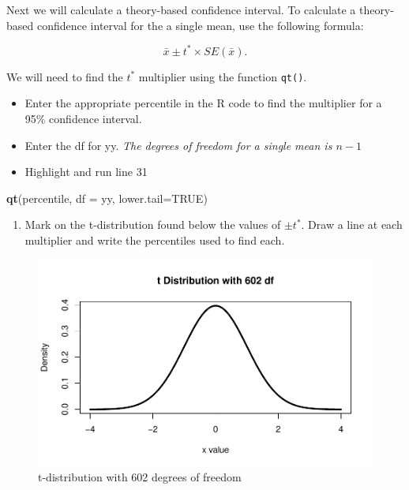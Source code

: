 \documentclass[
]{report}
\newenvironment{Shaded}{\begin{snugshade}}{\end{snugshade}}
\newcommand{\AttributeTok}[1]{\textcolor[rgb]{0.13,0.29,0.53}{#1}}
\newcommand{\ConstantTok}[1]{\textcolor[rgb]{0.56,0.35,0.01}{#1}}
\newcommand{\FunctionTok}[1]{\textcolor[rgb]{0.13,0.29,0.53}{\textbf{#1}}}
\newcommand{\NormalTok}[1]{#1}
\providecommand{\tightlist}{%
  \setlength{\itemsep}{0pt}\setlength{\parskip}{0pt}}
\begin{document}
Next we will calculate a theory-based confidence interval. To calculate a theory-based confidence interval for the a single mean, use the following formula:

\[\bar{x}\pm t^* \times SE(\bar{x}).\]

\newpage

We will need to find the \(t^*\) multiplier using the function \texttt{qt()}.

\begin{itemize}
\item
  Enter the appropriate percentile in the R code to find the multiplier for a 95\% confidence interval.
\item
  Enter the df for yy. \emph{The degrees of freedom for a single mean is \(n-1\)}
\item
  Highlight and run line 31
\end{itemize}

\begin{Shaded}
\begin{Highlighting}[]
\FunctionTok{qt}\NormalTok{(percentile, }\AttributeTok{df =}\NormalTok{ yy, }\AttributeTok{lower.tail=}\ConstantTok{TRUE}\NormalTok{)}
\end{Highlighting}
\end{Shaded}

\begin{enumerate}
\def\labelenumi{\arabic{enumi}.}
\setcounter{enumi}{3}
\tightlist
\item
  Mark on the t-distribution found below the values of \(\pm t^*\). Draw a line at each multiplier and write the percentiles used to find each.
  \vspace{1mm}
\end{enumerate}

\begin{figure}

{\centering \includegraphics[width=0.7\linewidth]{07-A14-onemean-CI_files/figure-latex/tstar-1} 

}

\caption{t-distribution with 602 degrees of freedom}\label{fig:tstar}
\end{figure}
\end{document}
